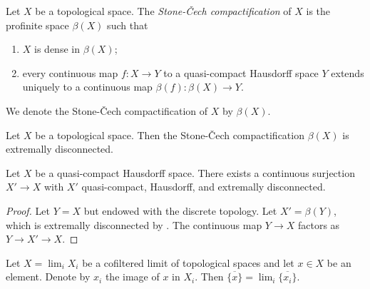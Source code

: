 \begin{definition} 
  \label{def:stone-cech-compactification}
  \mathlibok

  Let \(X\) be a topological space. The \emph{Stone-Čech compactification} of \(X\) is the
  profinite space \(\beta(X)\) such that
  \begin{enumerate}
    \item \(X\) is dense in \(\beta(X)\);
    \item every continuous map \(f: X \to Y\) to a quasi-compact Hausdorff space \(Y\)
        extends uniquely to a continuous map \(\beta(f): \beta(X) \to Y\).
  \end{enumerate}
  We denote the Stone-Čech compactification of \(X\) by \(\beta(X)\).
\end{definition}

\begin{theorem}
    Let \(X\) be a topological space. Then the Stone-Čech compactification \(\beta(X)\) is extremally disconnected.
    \label{thm:stone-cech-extremally-disconnected}
    \mathlibok
\end{theorem}

\begin{proposition}
  Let $X$ be a quasi-compact Hausdorff space. There exists a continuous surjection $X' \to X$ with $X'$ quasi-compact, Hausdorff, and extremally disconnected.
  \label{thm:extremally-disconnected-cover}
\end{proposition}

\begin{proof}
  Let $Y=X$ but endowed with the discrete topology. Let $X'=\beta (Y)$, which is extremally disconnected by . The continuous map $Y \to X$ factors as $Y \to X' \to X$.
\end{proof}

\begin{lemma}
    Let $X = \lim_i X_i$ be a cofiltered limit of topological spaces and let
    $x \in X$ be an element. Denote by $x_i$ the image of $x$ in $X_i$. Then
    $\overline{\{x\}} = \lim_i \overline{\{x_i\}}$.
    \label{lemma:closure-limit}
\end{lemma}

